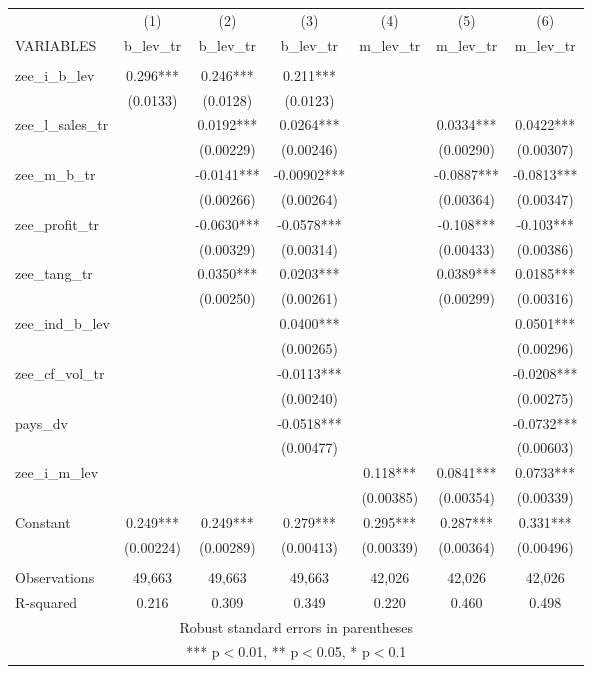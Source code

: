 \begin{tabular}{lcccccc} \hline
 & (1) & (2) & (3) & (4) & (5) & (6) \\
VARIABLES & b\_lev\_tr & b\_lev\_tr & b\_lev\_tr & m\_lev\_tr & m\_lev\_tr & m\_lev\_tr \\ \hline
 &  &  &  &  &  &  \\
zee\_i\_b\_lev & 0.296*** & 0.246*** & 0.211*** &  &  &  \\
 & (0.0133) & (0.0128) & (0.0123) &  &  &  \\
zee\_l\_sales\_tr &  & 0.0192*** & 0.0264*** &  & 0.0334*** & 0.0422*** \\
 &  & (0.00229) & (0.00246) &  & (0.00290) & (0.00307) \\
zee\_m\_b\_tr &  & -0.0141*** & -0.00902*** &  & -0.0887*** & -0.0813*** \\
 &  & (0.00266) & (0.00264) &  & (0.00364) & (0.00347) \\
zee\_profit\_tr &  & -0.0630*** & -0.0578*** &  & -0.108*** & -0.103*** \\
 &  & (0.00329) & (0.00314) &  & (0.00433) & (0.00386) \\
zee\_tang\_tr &  & 0.0350*** & 0.0203*** &  & 0.0389*** & 0.0185*** \\
 &  & (0.00250) & (0.00261) &  & (0.00299) & (0.00316) \\
zee\_ind\_b\_lev &  &  & 0.0400*** &  &  & 0.0501*** \\
 &  &  & (0.00265) &  &  & (0.00296) \\
zee\_cf\_vol\_tr &  &  & -0.0113*** &  &  & -0.0208*** \\
 &  &  & (0.00240) &  &  & (0.00275) \\
pays\_dv &  &  & -0.0518*** &  &  & -0.0732*** \\
 &  &  & (0.00477) &  &  & (0.00603) \\
zee\_i\_m\_lev &  &  &  & 0.118*** & 0.0841*** & 0.0733*** \\
 &  &  &  & (0.00385) & (0.00354) & (0.00339) \\
Constant & 0.249*** & 0.249*** & 0.279*** & 0.295*** & 0.287*** & 0.331*** \\
 & (0.00224) & (0.00289) & (0.00413) & (0.00339) & (0.00364) & (0.00496) \\
 &  &  &  &  &  &  \\
Observations & 49,663 & 49,663 & 49,663 & 42,026 & 42,026 & 42,026 \\
 R-squared & 0.216 & 0.309 & 0.349 & 0.220 & 0.460 & 0.498 \\ \hline
\multicolumn{7}{c}{ Robust standard errors in parentheses} \\
\multicolumn{7}{c}{ *** p$<$0.01, ** p$<$0.05, * p$<$0.1} \\
\end{tabular}
